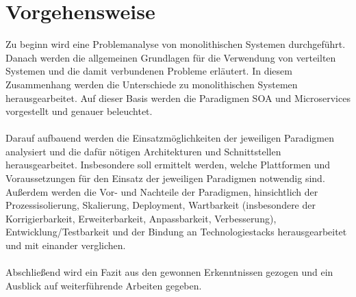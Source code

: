 \section{Vorgehensweise}
\label{sec:Vorgehensweise}
Zu beginn wird eine Problemanalyse von monolithischen Systemen durchgeführt. Danach werden die allgemeinen Grundlagen für die Verwendung von verteilten Systemen und die damit verbundenen Probleme erläutert. In diesem Zusammenhang werden die Unterschiede zu monolithischen Systemen herausgearbeitet. Auf dieser Basis werden die Paradigmen SOA und Microservices vorgestellt und genauer beleuchtet.
\\\\
Darauf aufbauend werden die Einsatzmöglichkeiten der jeweiligen Paradigmen analysiert und die dafür nötigen Architekturen und Schnittstellen herausgearbeitet. Insbesondere soll ermittelt werden, welche Plattformen und Voraussetzungen für den Einsatz der jeweiligen Paradigmen notwendig sind. Außerdem werden die Vor- und Nachteile der Paradigmen, hinsichtlich der Prozessisolierung, Skalierung, Deployment, Wartbarkeit (insbesondere der Korrigierbarkeit, Erweiterbarkeit, Anpassbarkeit, Verbesserung), Entwicklung/Testbarkeit und der Bindung an Technologiestacks herausgearbeitet und mit einander verglichen.
\\\\
Abschließend wird ein Fazit aus den gewonnen Erkenntnissen gezogen und ein Ausblick auf weiterführende Arbeiten gegeben.